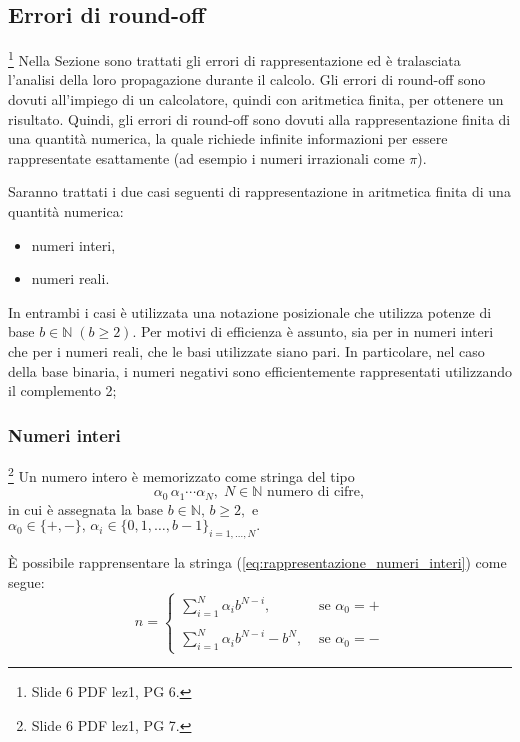 \subsection{Errori di round-off}\label{ssec:errori_roundoff}\footnote{Slide 6 PDF lez1, PG 6.}
Nella Sezione sono trattati gli errori di rappresentazione ed è tralasciata l'analisi della loro propagazione durante il calcolo. Gli errori di round-off sono dovuti all'impiego di un calcolatore, quindi con aritmetica finita, per ottenere un risultato. Quindi, gli errori di round-off sono dovuti alla rappresentazione finita di una quantità numerica, la quale richiede infinite informazioni  per essere rappresentate esattamente (ad esempio i numeri irrazionali come $\pi$). 

Saranno trattati i due casi seguenti di rappresentazione in aritmetica finita di una quantità numerica:
\begin{itemize}
	\item numeri interi,
	\item numeri reali.
\end{itemize}

In entrambi i casi è utilizzata una notazione posizionale che utilizza potenze di base $b\in\mathbb N\; (b\geq 2)$. Per motivi di efficienza è assunto, sia per in numeri interi che per i numeri reali, che le basi utilizzate siano pari. In particolare, nel caso della base binaria, i numeri negativi sono efficientemente rappresentati utilizzando il complemento 2;

\subsubsection{Numeri interi}\footnote{Slide 6 PDF lez1, PG 7.}
Un numero intero è memorizzato come stringa del tipo
\begin{equation}\label{eq:rappresentazione_numeri_interi}
	\alpha_0\,\alpha_1\cdots\alpha_N,\; N\in\mathbb N\text{ numero di cifre},
\end{equation}
in cui è assegnata la base $b\in\mathbb N,\, b\geq 2,$ e $ \alpha_0\in\{+,-\},\, \alpha_i\in\{0,1,\hdots, b-1\}_{i=1,\hdots,N}.$

È possibile rapprensentare la stringa (\ref{eq:rappresentazione_numeri_interi}) come segue:
\begin{equation}\label{eq:rapprNumIntCompl}
	n=\begin{cases}
		\sum_{i=1}^N\alpha_i b^{N-i}, &\text{ se } \alpha_0=+\\
		\\
		\sum_{i=1}^N\alpha_i b^{N-i} -b^N, &\text{ se } \alpha_0=-
	\end{cases}
\end{equation}


